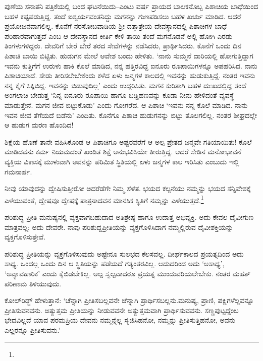 ಪುಣೆಯ ಸನಾತನಿ ಪತ್ರಿಕೆಯಲ್ಲಿ ಬಂದ ಘಟನೆಯಿದು–ಎಂಟು ವರ್ಷ ಪ್ರಾಯದ ಬಾಲಕ\-ನೊಬ್ಬ ಪಿಶಾಚಿಯ ಬಾಧೆಯಿಂದ ಬಹಳ ಕಷ್ಟಪಡುತ್ತಿದ್ದ. ತಂದೆ ಐಶ್ವರ್ಯವಂತನಿದ್ದು ಮಗನನ್ನು ಗುಣಪಡಿಸಲು ಬಹಳ ಖರ್ಚು ಮಾಡಿದ. ಆದರೆ ಪ್ರಯೋಜನವಾಗಲಿಲ್ಲ. ಕೊನೆಗೆ ನರಸೋಬವಾಡಿಯ ಶ‍್ರೀ ದತ್ತಾತ್ರೇಯ ದೇವಸ್ಥಾನದಲ್ಲಿ ಪಿಶಾಚಿಗಳ ಬಾಧೆ ಪರಿಹಾರವಾಗುತ್ತದೆ ಎಂಬ ಆ ದೇವಸ್ಥಾನದ ಕೀರ್ತಿ ಕೇಳಿ ತಾಯಿ ತಂದೆ ಮಗನೊಡನೆ ಅಲ್ಲಿ ಹೋಗಿ ಎರಡು ತಿಂಗಳುಗಳಿದ್ದರು. ದೇವರಿಗೆ ಬೇರೆ ಬೇರೆ ತರದ ಸೇವೆಗಳನ್ನು ನಡೆಸಿದರು, ಪ್ರಾರ್ಥಿಸಿದರು. ಕೊನೆಗೆ ಒಂದು ದಿನ ಪಿಶಾಚಿ ಬಾಯಿ ಬಿಟ್ಟಿತು. ಹುಡುಗನ ಮೇಲೆ ಆವೇಶ ಬಂದು ಹೇಳಿತು. ‘ನಾನು ಸುಮ್ಮನೆ ದಾರಿಯಲ್ಲಿ ಹೋಗುತ್ತಿದ್ದಾಗ ಇವನು ಕುತ್ತಿಗೆಗೆ ಉರುಳು ಹಾಕಿ ಕೊಲೆ ಮಾಡಿದ, ನನ್ನ ಹತ್ತಿರವಿದ್ದ ಐನೂರು ರೂಪಾಯಿಗಳನ್ನೂ ಅಪಹರಿಸಿದ. ನಾನು ಪಿಶಾಚಿಯಾದೆ. ಸೇಡು ತೀರಿಸಲೇಬೇಕೆಂದು ಕಳೆದ ಏಳು ಜನ್ಮಗಳ ಕಾಲದಲ್ಲಿ ಇವನನ್ನು ಹುಡುಕುತ್ತಿದ್ದೆ. ನಂತರ ಇವನು ನನ್ನ ಕೈಗೆ ಸಿಕ್ಕಿಬಿದ್ದ. ಇವನನ್ನು ಬಿಡುವುದಿಲ್ಲ’ ಎಂದು ಉದ್ಗರಿಸಿತು. ಮಗನ ಕುರಿತಾಗಿ ಬಹಳ ದುಃಖದಲ್ಲಿದ್ದ ತಂದೆ ಅಂಗಲಾಚಿ ಬೇಡುತ್ತ ‘ನಿನ್ನ ಐನೂರು ರೂಪಾಯಿ ಹಾಗೂ ಬಡ್ಡಿ\break ಹಣವನ್ನು ಕೂಡಾ ನೀನು ಹೇಳಿದಂತೆ ವ್ಯವಸ್ಥೆ ಮಾಡುತ್ತೇನೆ. ಮಗನ ಜೀವ ಬಿಟ್ಟುಕೊಡು’ ಎಂದು ಗೋಗರೆದ. ಆ ಪಿಶಾಚಿ ‘ಇವನು ನನ್ನ ಕೊಲೆ ಮಾಡಿದ. ನಾನು ಇವನ ಜೀವ ತೆಗೆಯದೆ ಬಿಡೆನು’ ಎಂದಿತು. ಕೊನೆಗೂ ಪಿಶಾಚಿ ಹುಡುಗನನ್ನು ಬಿಟ್ಟು ತೊಲಗಲಿಲ್ಲ. ನಂತರ ಶೀಘ್ರದಲ್ಲೇ ಆ ಹುಡುಗ ಮರಣ ಹೊಂದಿದ!

ಶಿಕ್ಷೆಯ ಹೊಣೆ ತಾನೇ ವಹಿಸಿಕೊಂಡ ಆ ಪಿಶಾಚಿಗೂ ಅಷ್ಟರವರೆಗೆ ಆ ಅಲ್ಪ ಪ್ರೇತದ ಜನ್ಮವೇ ಗತಿಯಾಯಿತು! ಕೊಲೆ ಮಾಡಿದವನು ಕರ್ಮ ನಿಯಮದಂತೆ ಖಂಡಿತ ಶಿಕ್ಷೆ ಅನುಭವಿಸಿಯೇ ತೀರುತ್ತಿದ್ದ. ಆದರೆ ಸೇಡಿನ ಮನೋಭಾವನೆ ವ್ಯಕ್ತಿಯ ವಿಕಾಸಕ್ಕೆ ಮುಳುವಾಗಿ ಅವನನ್ನು ಪರಿಮಿತ ಸ್ಥಿತಿಯಲ್ಲಿ ಏಳು ಜನ್ಮಗಳ ಕಾಲ ಇರಿಸಿತು ಎಂಬುದು ಇಲ್ಲಿ ಗಮನಾರ್ಹ.

ನೀವು ಯಾವುದನ್ನು ದ್ವೇಷಿಸುತ್ತೀರೋ ಅದರೆಡೆಗೇ ನಿಮ್ಮ ಸೆಳೆತ. ಭಯದ ಕಲ್ಪನೆಯು ನಮ್ಮನ್ನು ಭಯದ ಸನ್ನಿವೇಶಕ್ಕೆ ಎಳೆಯುವಂತೆ, ದ್ವೇಷವೂ ದ್ವೇಷಕ್ಕೆ ಪಾತ್ರನಾದವನ ಮಾನಸಿಕ ಸ್ಥಿತಿಗೆ ನಮ್ಮನ್ನು ಎಳೆಯುತ್ತದೆ.\footnote{\hfill{}}

ಪರಿಶುದ್ಧ ಪ್ರೀತಿ ಮನುಷ್ಯನಲ್ಲಿ ವ್ಯಕ್ತವಾಗಬಹುದಾದ ಅತಿಶ್ರೇಷ್ಠ ಹಾಗೂ ಉದಾತ್ತ ಅಭಿವ್ಯಕ್ತಿ. ಅದು ಕೇವಲ ದೈವೀಗುಣ ಮಾತ್ರವಲ್ಲ; ಅದು ದೇವರೇ. ನಾವು ಪರಿಶುದ್ದಪ್ರೀತಿಯನ್ನು ವ್ಯಕ್ತ\-ಗೊಳಿಸಿದಾಗ ನಮ್ಮಲ್ಲಿರುವ ದೈವೀಶಕ್ತಿಯನ್ನು ವ್ಯಕ್ತಗೊಳಿಸುತ್ತೇವೆ.

ಪರಿಶುದ್ಧ ಪ್ರೀತಿಯನ್ನು ವ್ಯಕ್ತಗೊಳಿಸುವುದು ಅಷ್ಟೇನೂ ಸುಲಭದ ಕೆಲಸವಲ್ಲ. ದೀರ್ಘಕಾಲದ ಪ್ರಯತ್ನದಿಂದ ಅದು ಸಾಧ್ಯ. ಒಂದಲ್ಲ ಒಂದು ದಿನ ಆ ಸ್ಥಿತಿಯನ್ನು ಪಡೆಯದೆ ಗತ್ಯಂತರವಿಲ್ಲ. ಆದುದರಿಂದ ಅದು ‘ಅಸಾಧ್ಯ’, ‘ಅವ್ಯಾವಹಾರಿಕ’ ಎಂದು ಕೈಬಿಡಬೇಕಿಲ್ಲ. ಅಲ್ಪ ಸ್ವಲ್ಪವಾದರೂ ಪ್ರಯತ್ನ ಮುಂದುವರಿಯಲೇಬೇಕು. ನಂತರ ಮಹತ್ ಪರಿಣಾಮ ತಿಳಿಯುವುದು.

ಕೋಲ್​ರಿಡ್ಜ್ ಹೇಳುತ್ತಾನೆ: ‘ಚೆನ್ನಾಗಿ ಪ್ರೀತಿಸಬಲ್ಲವನೇ ಚೆನ್ನಾಗಿ ಪ್ರಾರ್ಥಿಸಬಲ್ಲನು.\break ಮನುಷ್ಯ, ಪ್ರಾಣಿ, ಪಕ್ಷಿಗಳೆಲ್ಲವನ್ನೂ ಪ್ರೀತಿಸುವನವನು. ಅತ್ಯುತ್ತಮ ಪ್ರೀತಿಯನ್ನು ನೀಡುವವನೇ ಅತ್ಯುತ್ತಮವಾಗಿ ಪ್ರಾರ್ಥಿಸುವವನು. ಸಣ್ಣಪುಟ್ಟದ್ದೆಂಬ ಭೇದವಿಲ್ಲದೆ ಯಾವ ಪರಮಪ್ರಿಯ ದೇವನು ನಮ್ಮನ್ನೆಲ್ಲ ಸೃಜಿಸಿಹನೋ, ನಮ್ಮನ್ನು ಪ್ರೀತಿಸುತ್ತಿಹನೋ, ಅವನು ಎಲ್ಲರನ್ನೂ ಪ್ರೀತಿ\-ಸುವನು.’



